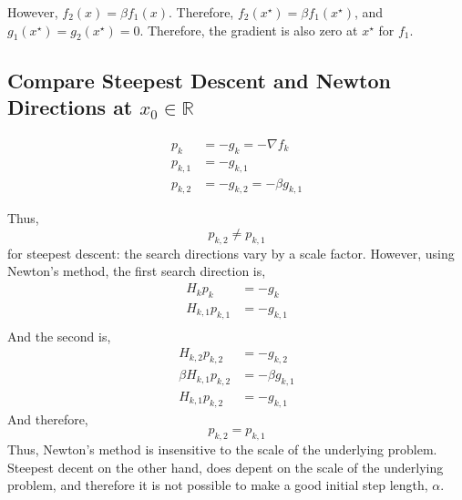 \documentclass{article}
\begin{document}
However, $f_2(x) = \beta f_1(x)$. Therefore,  $f_2(x^\star) = \beta
f_1(x^\star)$, and $g_1(x^\star) = g_2(x^\star) = 0 $. Therefore, the
gradient is also zero at $x^\star$ for $f_1$.

\subsection{Compare Steepest Descent and Newton Directions at $x_0 \in \mathbb{R}$}

\begin{align*}
 p_k&=-g_k = -\nabla f_k\\
 p_{k,1}&=-g_{k,1}\\
 p_{k,2}&=-g_{k,2} = -\beta g_{k,1}
\end{align*}

Thus, 
\begin{equation}
p_{k,2} \ne p_{k,1}
\end{equation}
for steepest descent: the search directions
vary by a scale factor. However, using Newton's method, the first search
direction is,
\begin{align*}
 H_k p_k&=-g_k \\
 H_{k,1} p_{k,1}&=-g_{k,1}\\
\end{align*}
And the second is,
\begin{align*}
 H_{k,2} p_{k,2}&=-g_{k,2}\\
 \beta H_{k,1} p_{k,2}&=- \beta g_{k,1}\\
 H_{k,1} p_{k,2}&=-g_{k,1}
\end{align*}
And therefore, 
\begin{equation}
p_{k,2} = p_{k,1}
\end{equation}
Thus, Newton's method is insensitive to the scale of the underlying
problem. Steepest decent on the other hand, does depent on the scale of
the underlying problem, and therefore it is not possible to make a good
initial step length, $\alpha$.
\end{document}
